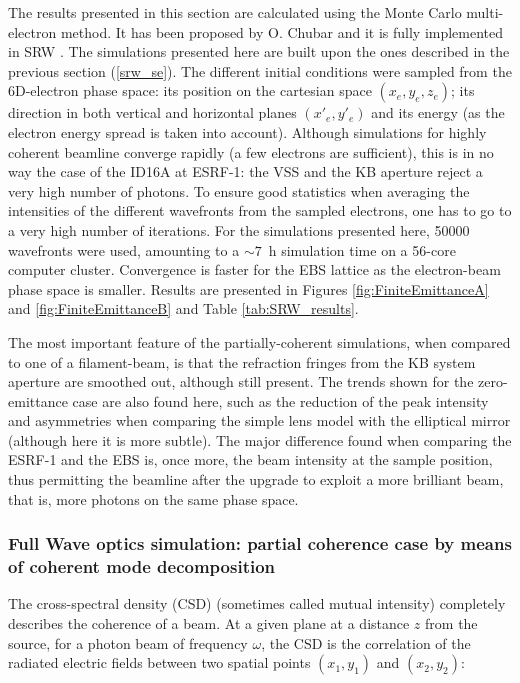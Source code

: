 \documentclass{iucr}              %
\begin{document}
The results presented in this section are calculated using the Monte Carlo multi-electron method. It has been proposed by O. Chubar and it is fully implemented in SRW \cite{Chubar2011b}. The simulations presented here are built upon the ones described in the previous section (\ref{srw_se}). The different initial conditions were sampled from the 6D-electron phase space: its position on the cartesian space $(x_e, y_e, z_e)$; its direction in both vertical and horizontal planes  $(x'_e, y'_e)$ and its energy (as the electron energy spread is taken into account). Although simulations for highly coherent beamline converge rapidly (a few electrons are sufficient), this is in no way the case of the ID16A at ESRF-1: the VSS and the KB aperture reject a very high number of photons. To ensure good statistics when averaging the intensities of the different wavefronts from the sampled electrons, one has to go to a very high number of iterations. For the simulations presented here, 50000 wavefronts were used, amounting to a $\sim7$~h simulation time on a 56-core computer cluster. Convergence is faster for the EBS lattice as the electron-beam phase space is smaller.  Results are presented in Figures \ref{fig:FiniteEmittanceA} and \ref{fig:FiniteEmittanceB} and Table \ref{tab:SRW_results}.

The most important feature of the partially-coherent simulations, when compared to one of a filament-beam, is that the refraction fringes from the KB system aperture are smoothed out, although still present. The trends shown for the zero-emittance case are also found here, such as the reduction of the peak intensity and asymmetries when comparing the simple lens model with the elliptical mirror (although here it is more subtle). The major difference found when comparing the ESRF-1 and the EBS is, once more, the beam intensity at the sample position, thus permitting the beamline after the upgrade to exploit a more brilliant beam, that is, more photons on the same phase space. 


\subsubsection{Full Wave optics simulation: partial coherence case by means of coherent mode decomposition}
\label{comsyl}


The cross-spectral density (CSD) (sometimes called mutual intensity) completely describes the coherence of a beam. 
At a given plane at a distance $z$ from the source, for a photon beam of frequency $\omega$, the CSD is the correlation of the radiated electric fields between two spatial points $(x_1,y_1)$ and $(x_2,y_2)$:
\end{document}
